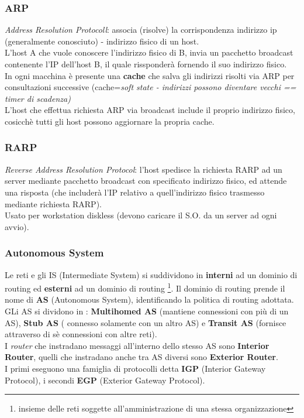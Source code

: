 \documentclass[a4paper,11pt]{article}
\begin{document}
 \subsubsection{ARP}
\textit{ Address Resolution Protocoll}: associa (risolve) la corrispondenza indirizzo ip (generalmente conosciuto) - indirizzo fisico di un host. \\
L'host A che vuole conoscere l'indirizzo fisico di B, invia un pacchetto broadcast contenente l'IP dell'host B, il quale rissponderà fornendo il suo indirizzo fisico. \\
In ogni macchina è presente una \textbf{cache} che salva gli indirizzi risolti via ARP per consultazioni successive (cache=\textit{soft state - indirizzi possono diventare vecchi == timer di scadenza)}\\
L'host che effettua richiesta ARP via broadcast include il proprio indirizzo fisico, cosicchè tutti gli host possono aggiornare la propria cache.
 \subsubsection{RARP}
\textit{ Reverse Address Resolution Protocol}: l'host spedisce la richiesta RARP ad un server mediante pacchetto broadcast con specificato indirizzo fisico, ed attende una risposta (che includerà l'IP relativo a quell'indirizzo fisico trasmesso mediante richiesta RARP).\\
Usato per workstation diskless (devono caricare il S.O. da un server ad ogni avvio).
\subsubsection{Autonomous System}
Le reti e gli IS (Intermediate System) si suddividono in \textbf{interni} ad un dominio di routing ed \textbf{esterni} ad un dominio di routing \footnote{insieme delle reti soggette all'amministrazione di una stessa organizzazione}. Il dominio di routing prende il nome di \textbf{AS} (Autonomous System), identificando la politica di routing adottata.\\
GLi AS si dividono in : \textbf{Multihomed AS} (mantiene connessioni con più di un AS), \textbf{Stub AS} ( connesso solamente con un altro AS) e \textbf{Transit AS} (fornisce attraverso di sè connessioni con altre reti).\\
I \textit{router} che instradano messaggi all'interno dello stesso AS sono \textbf{Interior Router}, quelli che instradano anche tra AS diversi sono \textbf{Exterior Router}.\\
I primi eseguono una famiglia di protocolli detta \textbf{IGP} (Interior Gateway Protocol), i secondi \textbf{EGP} (Exterior Gateway Protocol).
\newpage
\end{document}
